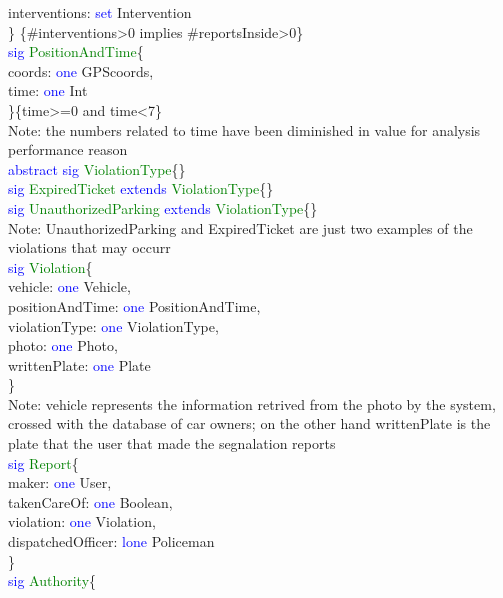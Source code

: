 interventions: \textcolor{blue}{set} Intervention\\
\} \{\#interventions>0 implies \#reportsInside>0\}\\
\textcolor{blue}{sig}
\textcolor{green}{PositionAndTime}\{ \\
coords: \textcolor{blue}{one} GPScoords,\\
time: \textcolor{blue}{one} Int\\ 
\}\{time>=0 and time<7\} \\
Note: the numbers related to time have been diminished in value for analysis performance reason\\
\textcolor{blue}{abstract sig}
\textcolor{green}{ViolationType}\{\} \\
\textcolor{blue}{sig}
\textcolor{green}{ExpiredTicket}
\textcolor{blue}{extends}
\textcolor{green}{ViolationType}\{\} \\
\textcolor{blue}{sig}
\textcolor{green}{UnauthorizedParking}
\textcolor{blue}{extends}
\textcolor{green}{ViolationType}\{\} \\
Note: UnauthorizedParking and ExpiredTicket are just two examples of the violations that may occurr\\
\textcolor{blue}{sig}
\textcolor{green}{Violation}\{ \\
vehicle: \textcolor{blue}{one} Vehicle,\\ 
positionAndTime: \textcolor{blue}{one} PositionAndTime,\\
violationType: \textcolor{blue}{one} ViolationType,\\
photo: \textcolor{blue}{one} Photo,\\
writtenPlate: \textcolor{blue}{one} Plate\\
\}\ \\
Note: vehicle represents the information retrived from the photo by the system, crossed with the database of car owners; on the other hand writtenPlate is the plate that the user that made the segnalation reports\\
\textcolor{blue}{sig}
\textcolor{green}{Report}\{\\
maker: \textcolor{blue}{one} User,\\
takenCareOf: \textcolor{blue}{one} Boolean,\\
violation: \textcolor{blue}{one} Violation,\\
dispatchedOfficer: \textcolor{blue}{lone} Policeman\\
\}\\
\textcolor{blue}{sig}
\textcolor{green}{Authority}\{\\
